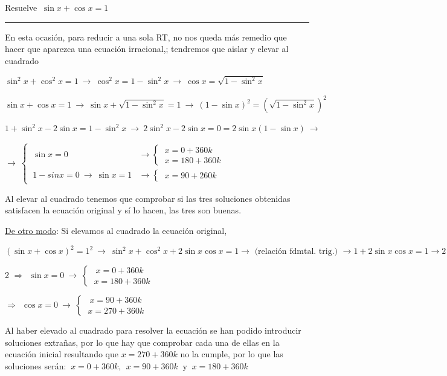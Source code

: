 \begin{miejercicio}

Resuelve $\ \sin x + \cos x = 1$

\rule{250pt}{0.1pt}

\vspace{3mm} En esta ocasión, para reducir a una sola RT,  no nos queda 	más remedio que hacer que aparezca una ecuación irracional,; tendremos que aislar y elevar al cuadrado

$\sin^2x+\cos^2x=1 \ \to \ \cos^2x=1-\sin^2 x\  \to \ \cos x=\sqrt{1-\sin^2 x}$

$\sin x+\cos x=1 \ \to \ \sin x+\sqrt{1-\sin^2 x}=1 \ \to \ (1-\sin x )^2= \left( \sqrt{1-\sin^2 x} \right)^2$

$1+\sin^2 x-2\sin x=1-\sin^2 x \ \to \ 2\sin^2 x-2\sin x=0=2\sin x(1-\sin x) \ \to$

$\to \ \begin{cases}
 \ \sin x =0 &\to \begin{cases} \ x=0+360k \\ \	x=180+360k \end{cases} \\
 \ 1-sin x =0 \ \to \ \sin x=1 &\to \begin{cases} \ x=90+260 k \end{cases}
  \end{cases}$
  
 Al elevar al cuadrado tenemos que comprobar si las tres soluciones obtenidas satisfacen la ecuación original y sí lo hacen, las tres son buenas.
 
\vspace{5mm} \underline{De otro modo}: Si elevamos al cuadrado la ecuación original,

$(\sin x+\cos x)^2=1^2 \ \to \ \sin^2 x + \cos^2 x+2\sin x \cos x=1 \to \text{ (relación fdmtal. trig.) } \to 1+2 \sin x \cos x = 1 \to 2 \sin x \cos x=0 \ \to \ \sin x \cdot \cos x=0 \ \Rightarrow $


\begin{multicols}{2}
$\Rightarrow \ \  \sin x = 0   \ \to \ \begin{cases} \ \ x=0+360k \\ \ x=180+360k \end{cases} $

$\Rightarrow \ \ \cos x = 0	\ \to \  \begin{cases} \ \ x=90+360k \\ \ x=270+360k \end{cases} $
\end{multicols}
 
Al haber elevado al cuadrado para resolver la ecuación se han podido introducir soluciones extrañas, por lo que hay que comprobar cada una de ellas en la ecuación inicial resultando que $x=270+360k$ no la cumple, por lo que las soluciones serán:
$\ x=0+360k,\ \ x=90+360k \ \text{ y } \ x=180+360k$

\end{miejercicio}



